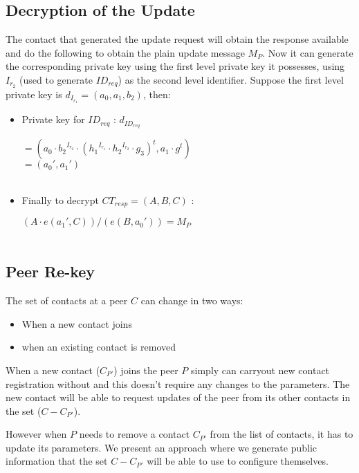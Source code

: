 \subsection{Decryption of the Update}
The contact that generated the update request will obtain the response available and do the following to obtain the plain update message $M_P$. Now it can generate the corresponding private key using the first level private key it possesses, using ${I_{r_2}}$ (used to generate $ID_{req}$) as the second level identifier. Suppose the first level private key is $d_{I_{r_1}} = (a_0, a_1, b_2)$, then:

\begin{itemize}
\item Private key for $ID_{req}$ : $d_{ID_{req}}$ 
\begin{center}
$= ({{a_0}\cdot{{b_2}^{I_{r_2}}}} \cdot {({{h_1}^{I_{r_1}}\cdot {h_2}^{I_{r_2}}} \cdot {g_3} )}^t , {a_1}\cdot{g^t})$\\
$ = ({a_0}', {a_1}')$\\\
\end{center}
\item Finally to decrypt $CT_{resp} = (A, B, C) $ :\\
	\begin{center}
$(A \cdot e({a_1}', C))/(e(B, {a_0}')) = M_P$\\\
	\end{center}
\end{itemize}


\subsection{Peer Re-key}
The set of contacts at a peer $C$ can change in two ways:
\begin{itemize}
\item When a new contact joins
\item when an existing contact is removed
\end{itemize}

When a new contact ($C_{P'}$) joins the peer $P$ simply can carryout new contact registration without and this doesn't require any changes to the parameters. The new contact will be able to request updates of the peer from its other contacts in the set ($C - C_{P'}$). 

However when $P$ needs to remove a contact $C_{P'}$ from the list of contacts, it has to update its parameters. We present an approach where we generate public information that the set $C - C_{P'}$ will be able to use to configure themselves.

